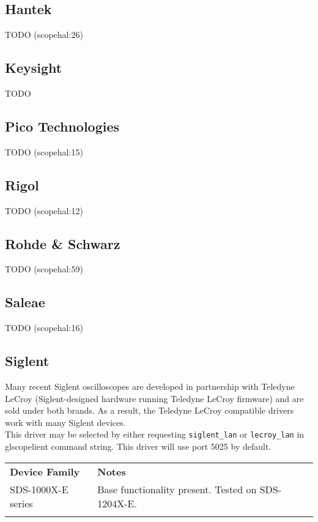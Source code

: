 \subsection{Hantek}
TODO (scopehal:26)

\subsection{Keysight}
TODO

\subsection{Pico Technologies}
TODO (scopehal:15)

\subsection{Rigol}
TODO (scopehal:12)

\subsection{Rohde \& Schwarz}
TODO (scopehal:59)

\subsection{Saleae}
TODO (scopehal:16)

\subsection{Siglent}

Many recent Siglent oscilloscopes are developed in partnership with Teledyne LeCroy (Siglent-designed hardware running
Teledyne LeCroy firmware) and are sold under both brands. As a result, the Teledyne LeCroy compatible drivers work with
many Siglent devices.\\

This driver may be selected by either requesting \texttt{siglent\_lan} or \texttt{lecroy\_lan} in glscopelient command
string. This driver will use port 5025 by default. \\

\begin{tabularx}{16cm}{llX}
\thickhline
\textbf{Device Family} & \textbf{Notes} \\
\thickhline
SDS-1000X-E series & Base functionality present. Tested on SDS-1204X-E. \\
\thickhline
\end{tabularx}

